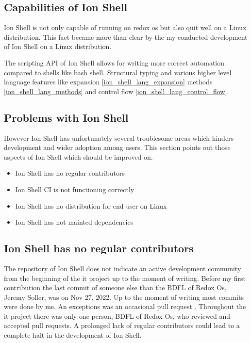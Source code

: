 \subsection{Capabilities of Ion Shell}

Ion Shell is not only capable of running on redox os but also quit well on a Linux distribution.
This fact became more than clear by the my conducted development of Ion Shell on a Linux distribution.

The scripting API of Ion Shell allows for writing more correct automation compared to shells like bash shell.
Structural typing and various higher level language features like expansion \ref{ion_shell_lang_expansion} methods \ref{ion_shell_lang_methods} and control flow \ref{ion_shell_lang_control_flow}.

\subsection{Problems with Ion Shell}\label{label:problems_ion_shell}

However Ion Shell has unfortunately several troublesome areas
which hinders development and wider adoption among users.
This section points out those aspects of Ion Shell which should be improved on.

\newcommand{\itemIonShellRegularContributor}{Ion Shell has no regular contributors}
\newcommand{\itemIonShellCI}{
	Ion Shell has not mainted dependencies
}
\newcommand{\itemIonShellDistribution}{
	Ion Shell has no distribution for end user on Linux
}
\newcommand{\itemIonShellDependencies}{Ion Shell CI is not functioning correctly}

\begin{itemize}
	\item \itemIonShellRegularContributor
	\item \itemIonShellDependencies
	\item \itemIonShellDistribution
	\item \itemIonShellCI
\end{itemize}

\subsection{\itemIonShellRegularContributor}

The repository of Ion Shell does not indicate an active development community
from the beginning of the it project up to the moment of writing.
Before my first contribution
the last commit of someone else than the BDFL of Redox Os, Jeremy Soller,
was on Nov 27, 2022.
Up to the moment of writing most commits were done by me.
An exceptions was an occasional pull request \cite{pr_ion_shell_global_alias}.
Throughout the it-project there was only one person, BDFL of Redox Os, who reviewed and accepted pull requests.
A prolonged lack of regular contributors could lead to a complete halt in the development of Ion Shell.

